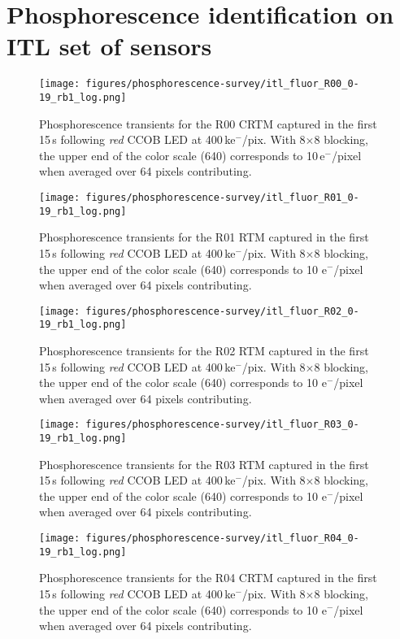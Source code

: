 \section{Phosphorescence identification on ITL set of sensors}

\begin{figure}[!htbp]
\centering
\texttt{[image: figures/phosphorescence-survey/itl\_fluor\_R00\_0-19\_rb1\_log.png]}
\caption{Phosphorescence transients for the R00 CRTM captured in the first 15\,s following {\it red} CCOB LED at 400\,ke$^-$/pix. With 8$\times$8 blocking, the upper end of the color scale (640) corresponds to 10\,e$^-$/pixel when averaged over 64 pixels contributing.}
\label{fig:phos:R00}
\end{figure}

\begin{figure}[!htbp]
\centering
\texttt{[image: figures/phosphorescence-survey/itl\_fluor\_R01\_0-19\_rb1\_log.png]}
\caption{Phosphorescence transients for the R01 RTM captured in the first 15\,s following {\it red} CCOB LED at 400\,ke$^-$/pix. With 8$\times$8 blocking, the upper end of the color scale (640) corresponds to 10 e$^-$/pixel when averaged over 64 pixels contributing.}
\label{fig:phos:R01}
\end{figure}

\begin{figure}[!htbp]
\centering
\texttt{[image: figures/phosphorescence-survey/itl\_fluor\_R02\_0-19\_rb1\_log.png]}
\caption{Phosphorescence transients for the R02 RTM captured in the first 15\,s following {\it red} CCOB LED at 400\,ke$^-$/pix. With 8$\times$8 blocking, the upper end of the color scale (640) corresponds to 10 e$^-$/pixel when averaged over 64 pixels contributing.}
\label{fig:phos:R02}
\end{figure}

\begin{figure}[!htbp]
\centering
\texttt{[image: figures/phosphorescence-survey/itl\_fluor\_R03\_0-19\_rb1\_log.png]}
\caption{Phosphorescence transients for the R03 RTM captured in the first 15\,s following {\it red} CCOB LED at 400\,ke$^-$/pix. With 8$\times$8 blocking, the upper end of the color scale (640) corresponds to 10 e$^-$/pixel when averaged over 64 pixels contributing.}
\label{fig:phos:R03}
\end{figure}

\begin{figure}[!htbp]
\centering
\texttt{[image: figures/phosphorescence-survey/itl\_fluor\_R04\_0-19\_rb1\_log.png]}
\caption{Phosphorescence transients for the R04 CRTM captured in the first 15\,s following {\it red} CCOB LED at 400\,ke$^-$/pix. With 8$\times$8 blocking, the upper end of the color scale (640) corresponds to 10 e$^-$/pixel when averaged over 64 pixels contributing.}
\label{fig:phos:R04}
\end{figure}


